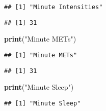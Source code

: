 \documentclass[
]{article}
\newenvironment{Shaded}{\begin{snugshade}}{\end{snugshade}}
\newcommand{\FunctionTok}[1]{\textcolor[rgb]{0.13,0.29,0.53}{\textbf{#1}}}
\newcommand{\NormalTok}[1]{#1}
\newcommand{\SpecialCharTok}[1]{\textcolor[rgb]{0.81,0.36,0.00}{\textbf{#1}}}
\newcommand{\StringTok}[1]{\textcolor[rgb]{0.31,0.60,0.02}{#1}}
\begin{document}
\begin{verbatim}
## [1] "Minute Intensities"
\end{verbatim}

\begin{Shaded}
\end{Shaded}

\begin{verbatim}
## [1] 31
\end{verbatim}

\begin{Shaded}
\begin{Highlighting}[]
\FunctionTok{print}\NormalTok{(}\StringTok{"Minute METs"}\NormalTok{)}
\end{Highlighting}
\end{Shaded}

\begin{verbatim}
## [1] "Minute METs"
\end{verbatim}

\begin{Shaded}
\end{Shaded}

\begin{verbatim}
## [1] 31
\end{verbatim}

\begin{Shaded}
\begin{Highlighting}[]
\FunctionTok{print}\NormalTok{(}\StringTok{"Minute Sleep"}\NormalTok{)}
\end{Highlighting}
\end{Shaded}

\begin{verbatim}
## [1] "Minute Sleep"
\end{verbatim}

\begin{Shaded}
\end{Shaded}
\end{document}
